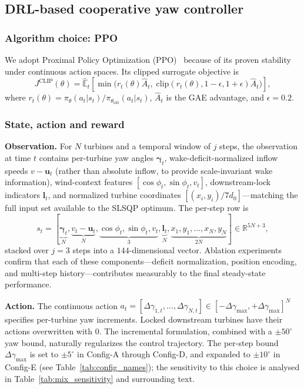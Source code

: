 \documentclass[final,5p,times]{elsarticle}
\begin{document}
\subsection{DRL-based cooperative yaw controller}\label{sec:drl}

\subsubsection{Algorithm choice: PPO}
We adopt Proximal Policy Optimization (PPO)~\citep{Schulman2017} because of its proven stability under continuous action spaces. Its clipped surrogate objective is
\begin{equation}
J^\mathrm{CLIP}(\theta)=\hat{\mathbb{E}}_t\!\left[\min\!\bigl(r_t(\theta)\hat A_t,\;\mathrm{clip}(r_t(\theta),1{-}\epsilon,1{+}\epsilon)\hat A_t\bigr)\right],
\label{eq:ppo}
\end{equation}
where $r_t(\theta)=\pi_\theta(a_t|s_t)/\pi_{\theta_\mathrm{old}}(a_t|s_t)$, $\hat A_t$ is the GAE advantage, and $\epsilon=0.2$.

\subsubsection{State, action and reward}
\textbf{Observation.} For $N$ turbines and a temporal window of $j$ steps, the observation at time $t$ contains per-turbine yaw angles $\boldsymbol{\gamma}_t$, wake-deficit-normalized inflow speeds $v-\boldsymbol{u}_t$ (rather than absolute inflow, to provide scale-invariant wake information), wind-context features $[\cos\phi_t,\sin\phi_t,v_t]$, downstream-lock indicators $\boldsymbol{l}_t$, and normalized turbine coordinates $[(x_i,y_i)/7d_0]$---matching the full input set available to the SLSQP optimum. The per-step row is
\begin{equation*}
s_t=[\underbrace{\boldsymbol{\gamma}_t}_{N},\underbrace{v_t-\boldsymbol{u}_t}_{N},\underbrace{\cos\phi_t,\sin\phi_t,v_t}_{3},\underbrace{\boldsymbol{l}_t}_{N},\underbrace{x_1,y_1,\ldots,x_N,y_N}_{2N}]\in\mathbb{R}^{5N+3},
\end{equation*}
stacked over $j{=}3$ steps into a $144$-dimensional vector. Ablation experiments confirm that each of these components---deficit normalization, position encoding, and multi-step history---contributes measurably to the final steady-state performance.

\textbf{Action.} The continuous action $a_t=[\Delta\gamma_{1,t},\ldots,\Delta\gamma_{N,t}]\in[-\Delta\gamma_\mathrm{max},+\Delta\gamma_\mathrm{max}]^N$ specifies per-turbine yaw increments. Locked downstream turbines have their actions overwritten with $0$. The incremental formulation, combined with a $\pm50^\circ$ yaw bound, naturally regularizes the control trajectory. The per-step bound $\Delta\gamma_\mathrm{max}$ is set to $\pm5^\circ$ in Config-A through Config-D, and expanded to $\pm10^\circ$ in Config-E (see Table~\ref{tab:config_names}); the sensitivity to this choice is analysed in Table~\ref{tab:mix_sensitivity} and surrounding text.
\end{document}
